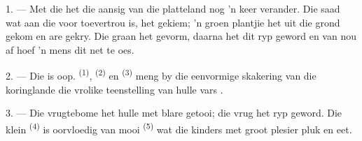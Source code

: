 %
%
%


\VUsaut{5.0mm}
\VUsaut{3.0mm}
\VUsaut{3.0mm}
\VUsaut{4.0mm}
\VUsaut{3.0mm}

1. --- Met die  het die aansig van die platteland nog 'n keer verander. Die
saad wat aan die voor toevertrou is, het gekiem; 'n groen plantjie het uit die grond
gekom en are gekry. Die graan het gevorm, daarna het dit ryp geword en van nou af hoef 'n
mens dit net te oes.

2. --- Die  is oop.  \textsuperscript{(1)},
 \textsuperscript{(2)} en 
\textsuperscript{(3)} meng by die eenvormige skakering van die koringlande die vrolike
teenstelling van hulle vars .

3. --- Die vrugtebome het hulle met blare getooi; die vrug het ryp geword. Die klein
 \textsuperscript{(4)} is oorvloedig van mooi 
\textsuperscript{(5)} wat die kinders met groot plesier pluk en eet.

